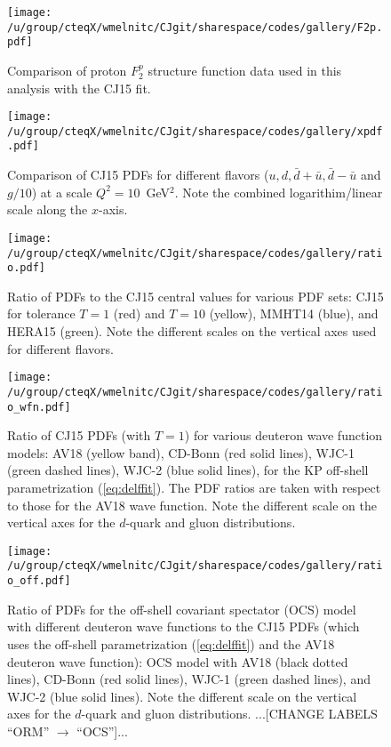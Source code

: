 \documentclass[aps,prd,amsmath,preprint]{revtex4}
\begin{document}
\newpage
\begin{figure}[t]
\texttt{[image: /u/group/cteqX/wmelnitc/CJgit/sharespace/codes/gallery/F2p.pdf]}
\caption{Comparison of proton $F_2^p$ structure function data
	used in this analysis with the CJ15 fit.}
\label{fig:F2p}
\end{figure} 


\begin{figure}[t]
\texttt{[image: /u/group/cteqX/wmelnitc/CJgit/sharespace/codes/gallery/xpdf.pdf]}
\caption{Comparison of CJ15 PDFs for different flavors
	($u, d, \bar d + \bar u, \bar d - \bar u$ and $g/10$)
	at a scale $Q^2=10$~GeV$^2$.
	Note the combined logarithim/linear scale along the $x$-axis.}
\label{fig:pdf}
\end{figure} 


\begin{figure}[t]
\texttt{[image: /u/group/cteqX/wmelnitc/CJgit/sharespace/codes/gallery/ratio.pdf]}
\caption{Ratio of PDFs to the CJ15 central values for various PDF sets:
	CJ15 for tolerance $T=1$ (red) and $T=10$ (yellow),
	MMHT14 \cite{MMHT14} (blue), and
	HERA15 \cite{HERA15} (green).
	Note the different scales on the vertical axes used for
	different flavors.}
\label{fig:ratio_other}
\end{figure} 


\begin{figure}[t]
\texttt{[image: /u/group/cteqX/wmelnitc/CJgit/sharespace/codes/gallery/ratio\_wfn.pdf]}
\caption{Ratio of CJ15 PDFs (with $T=1$) for various deuteron
	wave function models:
	AV18 (yellow band),
	CD-Bonn (red solid lines),
	WJC-1 (green dashed lines),
	WJC-2 (blue solid lines),
	for the KP off-shell parametrization (\ref{eq:delffit}).
	The PDF ratios are taken with respect to those for the
	AV18 wave function.
	Note the different scale on the vertical axes for the
	$d$-quark and gluon distributions.}
\label{fig:ratio_wfn}
\end{figure} 


\begin{figure}[t]
\texttt{[image: /u/group/cteqX/wmelnitc/CJgit/sharespace/codes/gallery/ratio\_off.pdf]}
\caption{Ratio of PDFs for the off-shell covariant spectator (OCS)
	model with different deuteron wave functions to the CJ15 PDFs
	(which uses the off-shell parametrization (\ref{eq:delffit})
	and the AV18 deuteron wave function):
	OCS model with AV18 (black dotted lines),
	CD-Bonn (red solid lines),
	WJC-1 (green dashed lines), and
	WJC-2 (blue solid lines).
	Note the different scale on the vertical axes for the
	$d$-quark and gluon distributions.
	...[CHANGE LABELS ``ORM'' $\to$ ``OCS'']...}
\label{fig:ratio_off}
\end{figure} 
\end{document}
